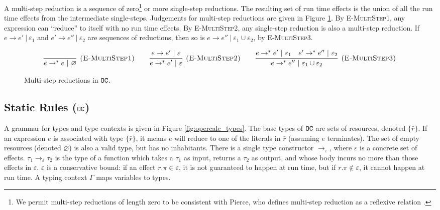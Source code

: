 A multi-step reduction is a sequence of zero\footnote{We permit multi-step reductions of length zero to be consistent with Pierce, who defines multi-step reduction as a reflexive relation \cite[p. 39]{pierce02}.} or more single-step reductions. The resulting set of run time effects is the union of all the run time effects from the intermediate single-steps. Judgements for multi-step reductions are given in Figure \ref{fig:opercalc_multistep_defn}. By \textsc{E-MultiStep1}, any expression can ``reduce'' to itself with no run time effects. By \textsc{E-MultiStep2}, any single-step reduction is also a multi-step reduction. If $e \longrightarrow e'~|~\varepsilon_1$ and $e' \longrightarrow e''~|~\varepsilon_2$ are sequences of reductions, then so is $e \longrightarrow e''~|~\varepsilon_1 \cup \varepsilon_2$, by \textsc{E-MultiStep3}.

\begin{figure}[h]

\noindent
{}

\[
\begin{array}{c}

\infer[\textsc{(E-MultiStep1)}]
	{ e \rightarrow^{*}  e~|~\varnothing}
	{}
	\hspace{5ex}
\infer[\textsc{(E-MultiStep2)}]
	{ e \rightarrow^{*}  e'~|~\varepsilon}
	{ e \rightarrow  e'~|~\varepsilon}
	\hspace{5ex}
\infer[\textsc{(E-MultiStep3)}]
	{ e \rightarrow^{*}  e''~|~\varepsilon_1 \cup \varepsilon_2}
	{ e \rightarrow^{*}  e'~|~\varepsilon_1 &  e' \rightarrow^{*}  e''~|~\varepsilon_2}
\end{array}
\]

\vspace{-7pt}
\caption{Multi-step reductions in $\mathtt{OC}$.}
\label{fig:opercalc_multistep_defn}
\end{figure}

\subsection{Static Rules ($\mathtt{OC}$)}

A grammar for types and type contexts is given in Figure \ref{fig:opercalc_types}. The base types of $\mathtt{OC}$ are sets of resources, denoted $\{ \bar r\}$. If an expression $e$ is associated with type $\{ \bar r \}$, it means $e$ will reduce to one of the literals in $\bar r$ (assuming $e$ terminates). The set of empty resources (denoted $\varnothing$) is also a valid type, but has no inhabitants. There is a single type constructor $\rightarrow_{\varepsilon}$, where $\varepsilon$ is a concrete set of effects. $\tau_1 \rightarrow_{\varepsilon} \tau_2$ is the type of a function which takes a $\tau_1$ as input, returns a $\tau_2$ as output, and whose body incurs no more than those effects in $\varepsilon$. $\varepsilon$ is a conservative bound: if an effect $r.\pi \in \varepsilon$, it is not guaranteed to happen at run time, but if $r.\pi \notin \varepsilon$, it cannot happen at run time. A typing context $\Gamma$ maps variables to types. 

